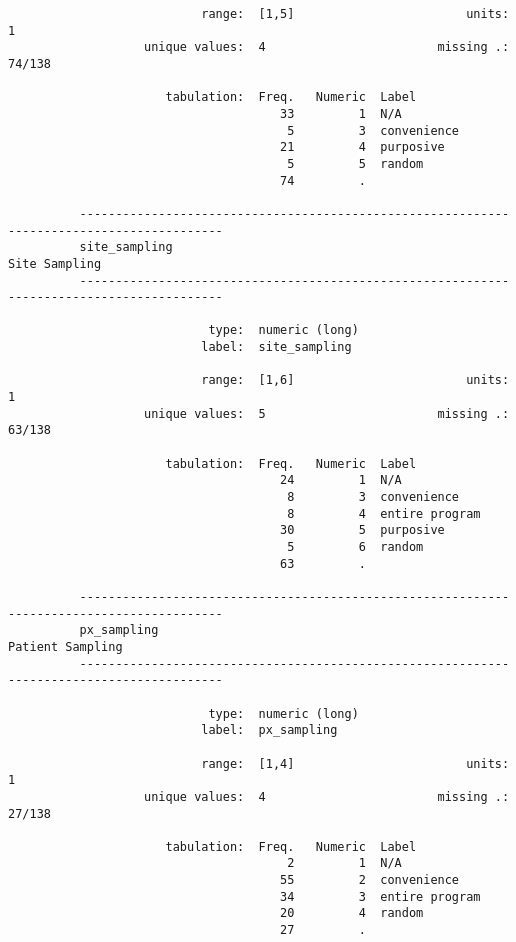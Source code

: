 \documentclass{article}
\begin{document}
\begin{verbatim}
                           range:  [1,5]                        units:  1
                   unique values:  4                        missing .:  74/138
          
                      tabulation:  Freq.   Numeric  Label
                                      33         1  N/A
                                       5         3  convenience
                                      21         4  purposive
                                       5         5  random
                                      74         .  
          
          ------------------------------------------------------------------------------------------
          site_sampling                                                                Site Sampling
          ------------------------------------------------------------------------------------------
          
                            type:  numeric (long)
                           label:  site_sampling
          
                           range:  [1,6]                        units:  1
                   unique values:  5                        missing .:  63/138
          
                      tabulation:  Freq.   Numeric  Label
                                      24         1  N/A
                                       8         3  convenience
                                       8         4  entire program
                                      30         5  purposive
                                       5         6  random
                                      63         .  
          
          ------------------------------------------------------------------------------------------
          px_sampling                                                               Patient Sampling
          ------------------------------------------------------------------------------------------
          
                            type:  numeric (long)
                           label:  px_sampling
          
                           range:  [1,4]                        units:  1
                   unique values:  4                        missing .:  27/138
          
                      tabulation:  Freq.   Numeric  Label
                                       2         1  N/A
                                      55         2  convenience
                                      34         3  entire program
                                      20         4  random
                                      27         .  
          

\end{verbatim}
\end{document}
